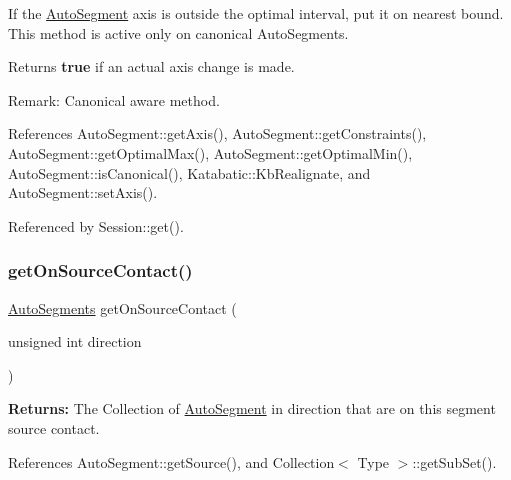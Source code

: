 If the \hyperlink{classKatabatic_1_1AutoSegment}{Auto\+Segment} axis is outside the optimal interval, put it on nearest bound. This method is active only on canonical Auto\+Segments.

\begin{DoxyReturn}{Returns}
{\bfseries true} if an actual axis change is made.
\end{DoxyReturn}
\begin{DoxyParagraph}{Remark\+:}
Canonical aware method. 
\end{DoxyParagraph}


References Auto\+Segment\+::get\+Axis(), Auto\+Segment\+::get\+Constraints(), Auto\+Segment\+::get\+Optimal\+Max(), Auto\+Segment\+::get\+Optimal\+Min(), Auto\+Segment\+::is\+Canonical(), Katabatic\+::\+Kb\+Realignate, and Auto\+Segment\+::set\+Axis().



Referenced by Session\+::get().

\mbox{\label{classKatabatic_1_1AutoSegment_a4430f9704a59e1d4f7c37d7166649510}} 
\subsubsection{\texorpdfstring{get\+On\+Source\+Contact()}{getOnSourceContact()}}
{\footnotesize\ttfamily \hyperlink{namespaceKatabatic_a2221b0ddbc24f331809fc86f98e38041}{Auto\+Segments} get\+On\+Source\+Contact (\begin{DoxyParamCaption}\item[{unsigned int}]{direction }\end{DoxyParamCaption})}

{\bfseries Returns\+:} The Collection of \hyperlink{classKatabatic_1_1AutoSegment}{Auto\+Segment} in {\ttfamily direction} that are on this segment source contact. 

References Auto\+Segment\+::get\+Source(), and Collection$<$ Type $>$\+::get\+Sub\+Set().

\mbox{\label{classKatabatic_1_1AutoSegment_aadbb84c0f1383f6a2addc2661e388583}} 

